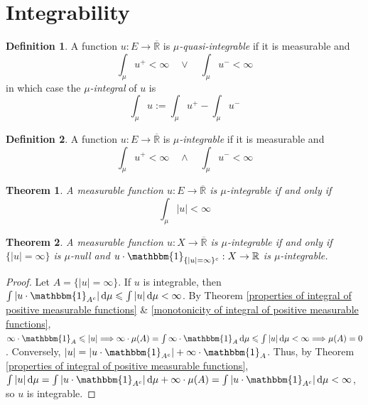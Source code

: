 \documentclass[11pt, a4paper, openany]{book}
\newtheorem{thm}{Theorem}\newtheorem{lem}{Lemma}\newtheorem{crl}{Corollary}
\theoremstyle{definition}
\newtheorem{define}{Definition}\newtheorem{exam}{Example}\newtheorem{remark}{Remark}
\newcommand{\er}{\overline{\mathbb{R}}}
\begin{document}
\section{Integrability}
    \begin{define}
        A function $u:E\rightarrow \er$ is \textit{$\mu$-quasi-integrable} if it is measurable and
        \[
            \int_\mu u^+<\infty\quad\vee\quad \int_\mu u^-<\infty
        \]
        in which case the \textit{$\mu$-integral} of $u$ is 
        \[
            \int_\mu u:=\int_\mu u^+-\int_\mu u^-
        \]
    \end{define}
    \begin{define}
        A function $u:E\rightarrow \er$ is \textit{$\mu$-integrable} if it is measurable and
        \[
            \int_\mu u^+<\infty\quad\wedge\quad \int_\mu u^-<\infty
        \]
    \end{define}
    \begin{thm}
        A measurable function $u:E\rightarrow \er$ is \textit{$\mu$-integrable} if and only if
        \[
            \int_\mu |u|<\infty
        \]
    \end{thm}
    \begin{thm}\label{integrable functions are a.e. real-valued}
        A measurable function $u:X\rightarrow \er$ is $\mu$-integrable if and only if $\{|u|=\infty\}$ is $\mu$-null and $u\cdot \mathbbm{1}_{\{|u|=\infty\}^c}:X\rightarrow \mathbb{R}$ is $\mu$-integrable. 
    \end{thm}
    \begin{proof}
        Let $A=\{|u|=\infty\}$. If $u$ is integrable, then $\int |u\cdot \mathbbm{1}_{A^c}|\odif \mu\leqslant \int |u|\odif \mu<\infty$. By Theorem \ref{properties of integral of positive measurable functions} \& \ref{monotonicity of integral of positive measurable functions}, $\infty\cdot \mathbbm{1}_A\leqslant |u|\Longrightarrow \infty\cdot \mu(A)=\int \infty\cdot \mathbbm{1}_A\odif \mu\leqslant \int |u|\odif \mu<\infty\Longrightarrow \mu(A)=0$. Conversely, $|u|=|u\cdot \mathbbm{1}_{A^c}|+\infty\cdot \mathbbm{1}_A$. Thus, by Theorem \ref{properties of integral of positive measurable functions}, $\int |u|\odif \mu=\int |u\cdot \mathbbm{1}_{A^c}|\odif \mu+\infty\cdot \mu(A)=\int |u\cdot \mathbbm{1}_{A^c}|\odif \mu<\infty$, so $u$ is integrable. %
    \end{proof}
\end{document}
